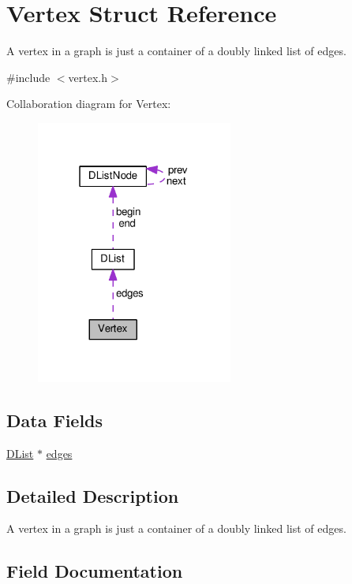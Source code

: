 \hypertarget{structVertex}{}\section{Vertex Struct Reference}
\label{structVertex}


A vertex in a graph is just a container of a doubly linked list of edges.  




{\ttfamily \#include $<$vertex.\+h$>$}



Collaboration diagram for Vertex\+:\nopagebreak
\begin{figure}[H]
\begin{center}
\leavevmode
\includegraphics[width=183pt]{structVertex__coll__graph}
\end{center}
\end{figure}
\subsection*{Data Fields}
\begin{DoxyCompactItemize}
\item 
\hyperlink{structDList}{D\+List} $\ast$ \hyperlink{structVertex_a1d47f7cbd5679ba2c22c556b39f994a8}{edges}
\end{DoxyCompactItemize}


\subsection{Detailed Description}
A vertex in a graph is just a container of a doubly linked list of edges. 

\subsection{Field Documentation}
